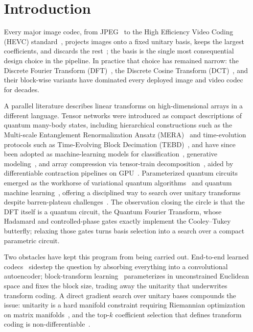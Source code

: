 \documentclass[a4paper, twocolumn]{quantumarticle}
\begin{document}
\section{Introduction}
\label{sec:introduction}

Every major image codec, from JPEG~\cite{wallace1992jpeg} to the High Efficiency Video Coding (HEVC) standard~\cite{sullivan2012hevc}, projects images onto a fixed unitary basis, keeps the largest coefficients, and discards the rest~\cite{goyal2001transform, mallat2008wavelet}; the basis is the single most consequential design choice in the pipeline.
In practice that choice has remained narrow: the Discrete Fourier Transform (DFT)~\cite{cooley1965fft}, the Discrete Cosine Transform (DCT)~\cite{ahmed1974dct}, and their block-wise variants have dominated every deployed image and video codec for decades.

A parallel literature describes linear transforms on high-dimensional arrays in a different language.
Tensor networks were introduced as compact descriptions of quantum many-body states, including hierarchical constructions such as the Multi-scale Entanglement Renormalization Ansatz (MERA)~\cite{vidal2007mera} and time-evolution protocols such as Time-Evolving Block Decimation (TEBD)~\cite{vidal2004tebd}, and have since been adopted as machine-learning models for classification~\cite{stoudenmire2016supervised}, generative modeling~\cite{han2018unsupervised}, and array compression via tensor-train decomposition~\cite{oseledets2011tensor}, aided by differentiable contraction pipelines on GPU~\cite{liu2021tropical, liu2023generic, OMEinsum}.
Parameterized quantum circuits emerged as the workhorse of variational quantum algorithms~\cite{mcclean2016variational, cerezo2021variational} and quantum machine learning~\cite{schuld2019quantum, benedetti2019parameterized}, offering a disciplined way to search over unitary transforms despite barren-plateau challenges~\cite{mcclean2018barren, cerezo2021cost}.
The observation closing the circle is that the DFT itself is a quantum circuit, the Quantum Fourier Transform, whose Hadamard and controlled-phase gates exactly implement the Cooley--Tukey butterfly; relaxing those gates turns basis selection into a search over a compact parametric circuit.

Two obstacles have kept this program from being carried out.
End-to-end learned codecs~\cite{balle2017end, theis2017} sidestep the question by absorbing everything into a convolutional autoencoder; block-transform learning~\cite{pons2024rdlt} parameterizes in unconstrained Euclidean space and fixes the block size, trading away the unitarity that underwrites transform coding.
A direct gradient search over unitary bases compounds the issue: unitarity is a hard manifold constraint requiring Riemannian optimization on matrix manifolds~\cite{edelman1998geometry, absil2008optimization, boumal2023introduction, becigneul2019riemannian, kasai2019riemannian, khaneja2005optimal, wen2013feasible}, and the top-$k$ coefficient selection that defines transform coding is non-differentiable~\cite{bengio2013estimating}.
\end{document}
